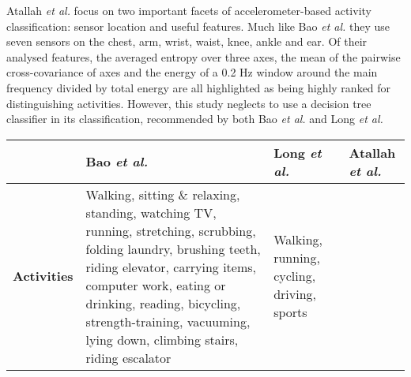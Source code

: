     Atallah \emph{et al.} \cite{atallah2010sensor} focus on two important facets of accelerometer-based activity classification: sensor location and useful features. Much like Bao \emph{et al.} they use seven sensors on the chest, arm, wrist, waist, knee, ankle and ear. Of their analysed features, the averaged entropy over three axes, the mean of the pairwise cross-covariance of axes and the energy of a 0.2 Hz window around the main frequency divided by total energy are all highlighted as being highly ranked for distinguishing activities. However, this study neglects to use a decision tree classifier in its classification, recommended by both Bao \emph{et al.} and Long \emph{et al.}
    \begin{table}[p]
      {\tabulinesep=1.2mm
      \begin{tabu} to 
        \hline
          & \textbf{Bao \emph{et al.} \cite{bao2004activity}}
          & \textbf{Long \emph{et al.} \cite{long2009single}}
          & \textbf{Atallah \emph{et al.} \cite{atallah2010sensor}} \\
        \hline
          \textbf{Activities}
          & Walking, \newline sitting \& relaxing, \newline standing, \newline watching TV,
              \newline running, \newline stretching, \newline scrubbing, \newline folding laundry, 
              \newline brushing teeth, \newline riding elevator, \newline carrying items, 
              \newline computer work, \newline eating or drinking, \newline reading, 
              \newline bicycling, \newline strength-training, \newline vacuuming, 
              \newline lying down, \newline climbing stairs, \newline riding escalator
          & Walking, \newline running, \newline cycling, \newline driving, \newline sports

\end{tabu}}
\end{table}
